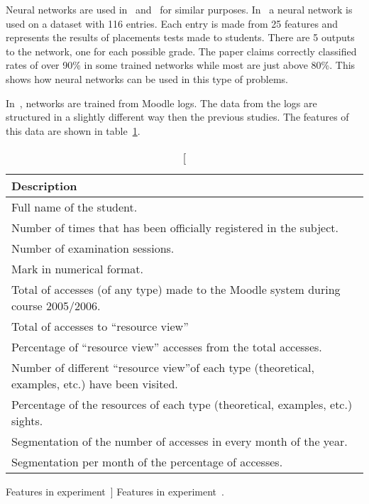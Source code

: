 Neural networks are used in~\cite{ind_003} and~\cite{ind_006} for similar
purposes. In~\cite{ind_003} a neural network is used on a dataset with 116
entries. Each entry is made from 25 features and represents the results of
placements tests made to students. There are 5 outputs to the network, one for
each possible grade. The paper claims correctly classified rates of over 90\%
in some trained networks while most are just above 80\%. This shows how neural
networks can be used in this type of problems.

In~\cite{ind_006}, networks are trained from Moodle logs. The data from the
logs are structured in a slightly different way then the previous studies. The
features of this data are shown in table~\ref{tab:ind_006_fields}.

\begin{table}[h!]
    \centering

    \begin{tabular}{l}
        Description \\ \hline
        Full name of the student. \\
        Number of times that has been officially registered in the subject. \\
        Number of examination sessions. \\
        Mark in numerical format. \\
        Total of accesses (of any type) made to the Moodle system during course 2005/2006. \\
        Total of accesses to “resource view” \\
        Percentage of “resource view” accesses from the total accesses. \\
        Number of different “resource view”of each type (theoretical, examples, etc.) have been visited. \\
        Percentage of the resources of each type (theoretical, examples, etc.) sights. \\
        Segmentation of the number of accesses in every month of the year. \\
        Segmentation per month of the percentage of accesses. \\
    \end{tabular}

    \caption
        [Features in experiment~\cite{ind_006}]
        {Features in experiment~\cite{ind_006}.}

    \label{tab:ind_006_fields}
\end{table}

